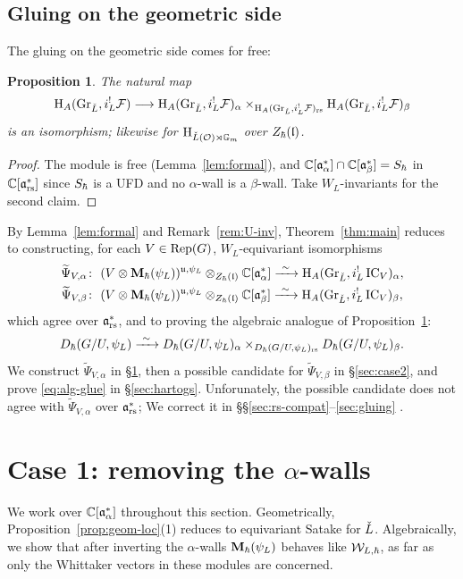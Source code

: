 \documentclass{article}
\theoremstyle{plain}
\newtheorem{proposition}[theorem]{Proposition}
\theoremstyle{definition}
\theoremstyle{remark}
\numberwithin{equation}{section}
\begin{document}
\subsection{Gluing on the geometric side}\label{sec:geom-glue}
The gluing on the geometric side comes for free:
\begin{proposition}\label{prop:geom-glue}
The natural map
\[
\mathrm{H}_A(\operatorname{Gr}_{\check{L}},i_L^!\mathcal{F})\longrightarrow\mathrm{H}_A(\operatorname{Gr}_{\check{L}},i_L^!\mathcal{F})_\alpha\times_{\mathrm{H}_A(\operatorname{Gr}_{\check{L}},i_L^!\mathcal{F})_{\mathrm{rs}}}\mathrm{H}_A(\operatorname{Gr}_{\check{L}},i_L^!\mathcal{F})_\beta
\]
is an isomorphism; likewise for $\mathrm{H}_{\check{L}(\mathcal{O})\rtimes\mathbb{G}_m}$ over $Z_\hbar(\mathfrak{l})$.
\end{proposition}

\begin{proof}
The module is free (Lemma~\ref{lem:formal}), and $\mathbb{C}[\mathfrak{a}^*_{\alpha}]\cap\mathbb{C}[\mathfrak{a}^*_{\beta}]=S_\hbar$ in $\mathbb{C}[\mathfrak{a}^*_{\mathrm{rs}}]$ since $S_\hbar$ is a UFD and no $\alpha$-wall is a $\beta$-wall. Take $W_L$-invariants for the second claim.
\end{proof}

By Lemma~\ref{lem:formal} and Remark~\ref{rem:U-inv}, Theorem~\ref{thm:main} reduces to constructing, for each $V\in\operatorname{Rep}(G)$, $W_L$-equivariant isomorphisms
\begin{align}
\widetilde\Psi_{V,\alpha}&\colon\ (V\otimes\bM_\hbar(\psiL))^{\fraku,\psiL}\otimes_{\Zh(\frakl)}\Cal\xrightarrow{\ \sim\ }\H_A(\GrL,i_L^!\IC_V)_\alpha, \label{eq:PsiA}\\
\widetilde\Psi_{V,\beta}&\colon\ (V\otimes\bM_\hbar(\psiL))^{\fraku,\psiL}\otimes_{\Zh(\frakl)}\Cbe\xrightarrow{\ \sim\ }\H_A(\GrL,i_L^!\IC_V)_\beta, \label{eq:PsiB}
\end{align}
which agree over $\mathfrak{a}^*_{\mathrm{rs}}$, and to proving the algebraic analogue of Proposition~\ref{prop:geom-glue}:
\begin{equation}\label{eq:alg-glue}
\Dh(G/U,\psiL)\xrightarrow{\ \sim\ }\Dh(G/U,\psiL)_\alpha\times_{\Dh(G/U,\psiL)_\rs}\Dh(G/U,\psiL)_\beta .
\end{equation}
We construct $\widetilde\Psi_{V,\alpha}$ in \S\ref{sec:case1}, then a possible candidate for $\widetilde\Psi_{V,\beta}$ in \S\ref{sec:case2}, and prove \eqref{eq:alg-glue} in \S\ref{sec:hartogs}. Unforunately, the possible candidate does not agree with $\widetilde\Psi_{V,\alpha}$ over $\mathfrak{a}^*_{\mathrm{rs}}$; We correct it in \S\S\ref{sec:rs-compat}--\ref{sec:gluing} .


\section{Case 1: removing the \texorpdfstring{$\alpha$}{alpha}-walls}\label{sec:case1}
We work over $\mathbb{C}[\mathfrak{a}^*_{\alpha}]$ throughout this section. Geometrically, Proposition~\ref{prop:geom-loc}(1) reduces to equivariant Satake for $\check{L}$. Algebraically, we show that after inverting the $\alpha$-walls $\mathbf{M}_\hbar(\psi_L)$ behaves like $\mathcal{W}_{L,\hbar}$, as far as only the Whittaker vectors in these modules are concerned.
\end{document}
